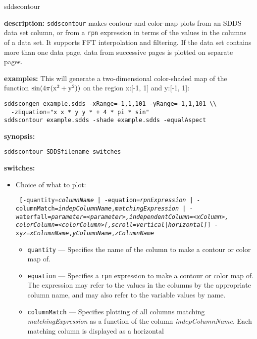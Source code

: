 \begin{sddsprog}{sddscontour}
  \item {\bf description:}
  \verb|sddscontour| makes contour and color-map plots from an SDDS data set column, or from a \verb|rpn| expression
  in terms of the values in the columns of a data set. It supports FFT interpolation and filtering. If the
  data set contains more than one data page, data from successive pages is plotted on separate pages.

  \item {\bf examples:}
  This will generate a two-dimensional color-shaded map of the function ${\rm sin(4\pi (x^2 + y^2))}$ on
  the region x:[-1, 1] and y:[-1, 1]:
  \begin{verbatim}
sddscongen example.sdds -xRange=-1,1,101 -yRange=-1,1,101 \\
  -zEquation="x x * y y * + 4 * pi * sin"
sddscontour example.sdds -shade example.sdds -equalAspect
  \end{verbatim}
  \item {\bf synopsis:}
  \begin{verbatim}
sddscontour SDDSfilename switches
  \end{verbatim}
  \item {\bf switches:}
    \begin{itemize}
    \item Choice of what to plot:
\begin{flushleft}{\tt
[{-quantity={\em columnName} | -equation={\em rpnExpression} | 
 -columnMatch={\em indepColumnName},{\em matchingExpression}} |
 -waterfall={\em parameter=<parameter>,independentColumn=<xColumn>, 
             colorColumn=<colorColumn>[,scroll=vertical|horizontal]}]
 -xyz={\em xColumnName},{\em yColumnName},{\em zColumnName} 
}\end{flushleft}
\begin{itemize}
        \item \verb|quantity| --- Specifies the name of the column to make a contour or color map of.
        \item \verb|equation| --- Specifies a \verb|rpn| expression to make a contour or color map of.
        The expression may refer to the values in the columns by the appropriate column name, and may
        also refer to the variable values by name.
        \item \verb|columnMatch| --- Specifies plotting of all columns matching {\em matchingExpression}
        as a function of the column {\em indepColumnName}.  Each matching column is displayed as a horizontal 

\end{itemize}
\end{itemize}
\end{sddsprog}
